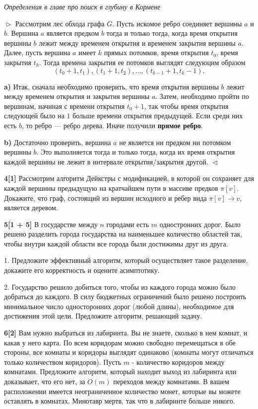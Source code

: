 \documentclass{article}
\begin{document}
\textit{Определения в главе про поиск в глубину в Кормене}

$\vartriangleright$
Рассмотрим лес обхода графа $G$. Пусть искомое ребро соединяет вершины $a$ и $b$. Вершина $a$ является предком $b$ тогда и только тогда,
когда время открытия вершины $b$ лежит между временем открытия и временем закрытия вершины $a$. Далее, пусть вершина $a$ имеет
$k$ прямых потомков, время открытия $t_{0}$, время закрытия $t_{k}$. Тогда времена закрытия ее потомков выглядят следуюцим образом
\[(t_{0} + 1, t_{1}), (t_{1} + 1, t_{2}),\ldots, (t_{k-1} + 1, t_{k} - 1).\]

\textbf{a)} Итак, сначала необходимо проверить, что время открытия вершины $b$ лежит между временем открытия и закрытия
вершины $a$. Затем, необходимо пройти по вершинам, начиная с времени открытия $t_{0} + 1$, так чтобы время открытия следующей
было на $1$ больше времени открытия предыдущей. Если среди них есть $b$, то ребро --- ребро дерева. Иначе получили
\textbf{прямое ребро}.

\textbf{b)} Достаточно проверить, вершина $a$ не является ни предком ни потомком вершины $b$. Это выполняется
тогда и только тогда, когда их время открытия каждой вершины не лежит в интервале открытия/закрытия другой.
$\vartriangleleft$
\medskip

\textbf{4[1]} Рассмотрим алгоритм Дейкстры с модификацией, в которой он сохраняет для каждой вершины предыдущую на кратчайшем пути в массиве предков $\pi[v]$. Докажите, что граф, состоящий из вершин исходного и ребер вида $\pi[v] \rightarrow v$, является деревом.

\medskip

\textbf{5[1 + 5]} В государстве между $n$ городами есть $m$ одностронних дорог. Было решено разделить города государства на наименьшее количество областей так, чтобы внутри каждой области
все города были достижимы друг из друга.

1. Предложите эффективный алгоритм, который осуществляет такое разделение, докажите его корректность и оцените асимптотику.

2. Государство решило добиться того, чтобы из каждого города можно было добраться до каждого. В силу бюджетных ограничений было решено построить минимальное число односторонних дорог (любой длины), необходимое для достижения этой цели. Предложите алгоритм, решающий задачу.

\medskip

\textbf{6[2]} Вам нужно выбраться из лабиринта. Вы не знаете, сколько в нем комнат, и какая у него карта. По всем коридорам можно свободно перемещаться в обе стороны, все комнаты и коридоры выглядят одинаково (комнаты могут отличаться только количеством коридоров).
Пусть $m$ - количество коридоров между комнатами. Предложите алгоритм, который находит выход из лабиринта или доказывает, что его нет, за $O(m)$ переходов между комнатами. В вашем расположении имеется неограниченное количество монет, которые вы можете оставлять
в комнатах. Минотавр мертв, так что в лабиринте больше никого.
\end{document}
